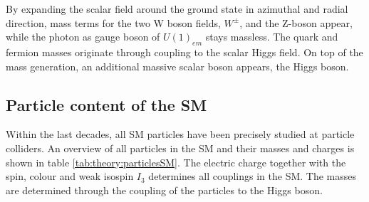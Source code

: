 By expanding the scalar field around the ground state in azimuthal and radial direction, mass terms for the two W boson fields, $W^\pm$, and the Z-boson appear, while the photon as gauge boson of $U(1)_{em}$ stays massless. The quark and fermion masses originate through coupling to the scalar Higgs field. On top of the mass generation, an additional massive scalar boson appears, the Higgs boson.


\subsection{Particle content of the SM}
Within the last decades, all SM particles have been precisely studied at particle colliders. An overview of all particles in the SM and their masses and charges is shown in table \ref{tab:theory:particlesSM}. 
The electric charge together with the spin, colour and weak isospin $I_3$ determines all couplings in the SM.
The masses are determined through the coupling of the particles to the Higgs boson.
